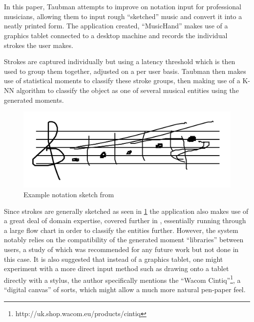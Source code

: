 \section {\cite{taubman2005musichand}}

In this paper, Taubman attempts to improve on notation input for professional musicians, allowing them to input rough ``sketched'' music and convert it into a neatly printed form. The application created, ``MusicHand'' makes use of a graphics tablet connected to a desktop machine and records the individual strokes the user makes.

Strokes are captured individually but using a latency threshold which is then used to group them together, adjusted on a per user basis. Taubman then makes use of statistical moments  to classify these stroke groups, then making use of a K-NN algorithm to classify the object as one of several musical entities using the generated moments.

\begin{figure}[h]
  \includegraphics[width=\linewidth/2]{gfx/prior-research/taubman-sketch.png}
  \centering
  \caption{Example notation sketch from \cite{taubman2005musichand}}
  \label{fig:taubman-sketch}
\end{figure}

Since strokes are generally sketched as seen in \ref{fig:taubman-sketch} the application also makes use of a great deal of domain expertise, covered further in , essentially running through a large flow chart in order to classify the entities further. However, the system notably relies on the compatibility of the generated moment ``libraries'' between users, a study of which was recommended for any future work but not done in this case. It is also suggested that instead of a graphics tablet, one might experiment with a more direct input method such as drawing onto a tablet directly with a stylus, the author specifically mentions the ``Wacom Cintiq''\footnote{http://uk.shop.wacom.eu/products/cintiq}, a ``digital canvas'' of sorts, which might allow a much more natural pen-paper feel.

